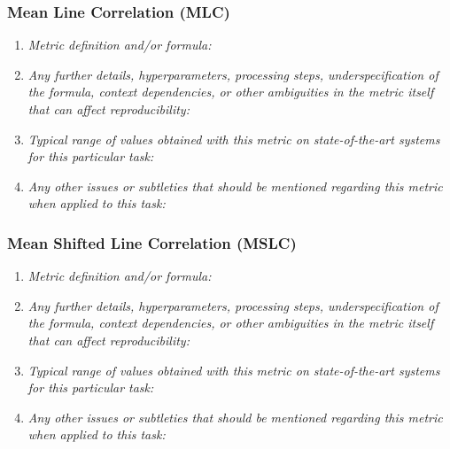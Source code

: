 \documentclass[a4paper,11pt]{article}
\begin{document}
        \subsubsection{Mean Line Correlation (MLC)}
            \begin{enumerate}[label=\alph*.]
                \item \textit{Metric definition and/or formula:}
                \bigskip
                \item \textit{Any further details, hyperparameters, processing steps, underspecification of the formula, context dependencies, or other ambiguities in the metric itself that can affect reproducibility:}
                \bigskip
                \item \textit{Typical range of values obtained with this metric on state-of-the-art systems for this particular task:}
                \bigskip
                \item \textit{Any other issues or subtleties that should be mentioned regarding this metric when applied to this task:}
                \bigskip
            \end{enumerate}
        \subsubsection{Mean Shifted Line Correlation (MSLC)}
            \begin{enumerate}[label=\alph*.]
                \item \textit{Metric definition and/or formula:}
                \bigskip
                \item \textit{Any further details, hyperparameters, processing steps, underspecification of the formula, context dependencies, or other ambiguities in the metric itself that can affect reproducibility:}
                \bigskip
                \item \textit{Typical range of values obtained with this metric on state-of-the-art systems for this particular task:}
                \bigskip
                \item \textit{Any other issues or subtleties that should be mentioned regarding this metric when applied to this task:}
                \bigskip
            \end{enumerate}
\end{document}
